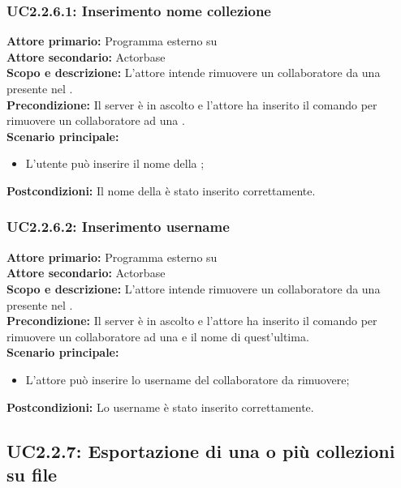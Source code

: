 \documentclass{scalatekids-article}
\begin{document}
\subsubsection{UC2.2.6.1: Inserimento nome collezione}

\textbf{Attore primario:} Programma esterno su \\
\textbf{Attore secondario:} Actorbase\\
\textbf{Scopo e descrizione:} L’attore intende rimuovere un collaboratore da una  presente nel .\\
\textbf{Precondizione:} Il server è in ascolto e l’attore ha inserito il comando per rimuovere un collaboratore ad una .\\
\textbf{Scenario principale:}
\begin{itemize}
\item L'utente può inserire il nome della ;
\end{itemize}
\textbf{Postcondizioni:} Il nome della  è stato inserito correttamente.

\subsubsection{UC2.2.6.2: Inserimento username}

\textbf{Attore primario:} Programma esterno su \\
\textbf{Attore secondario:} Actorbase\\
\textbf{Scopo e descrizione:} L’attore intende rimuovere un collaboratore da una  presente nel .\\
\textbf{Precondizione:} Il server è in ascolto e l’attore ha inserito il comando per rimuovere un collaboratore ad una  e il nome di quest'ultima.\\
\textbf{Scenario principale:}
\begin{itemize}
\item L'attore può inserire lo username del collaboratore da rimuovere;
\end{itemize}
\textbf{Postcondizioni:} Lo username è stato inserito correttamente.

\subsection{UC2.2.7: Esportazione di una o più collezioni su file}
\end{document}
